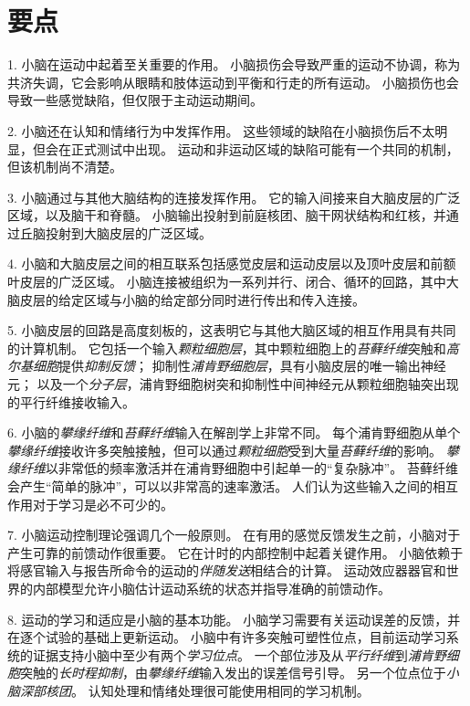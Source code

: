 \section{要点}

1. 小脑在运动中起着至关重要的作用。
小脑损伤会导致严重的运动不协调，称为共济失调，它会影响从眼睛和肢体运动到平衡和行走的所有运动。
小脑损伤也会导致一些感觉缺陷，但仅限于主动运动期间。


2. 小脑还在认知和情绪行为中发挥作用。
这些领域的缺陷在小脑损伤后不太明显，但会在正式测试中出现。
运动和非运动区域的缺陷可能有一个共同的机制，但该机制尚不清楚。


3. 小脑通过与其他大脑结构的连接发挥作用。
它的输入间接来自大脑皮层的广泛区域，以及脑干和脊髓。
小脑输出投射到前庭核团、脑干网状结构和红核，并通过丘脑投射到大脑皮层的广泛区域。


4. 小脑和大脑皮层之间的相互联系包括感觉皮层和运动皮层以及顶叶皮层和前额叶皮层的广泛区域。
小脑连接被组织为一系列并行、闭合、循环的回路，其中大脑皮层的给定区域与小脑的给定部分同时进行传出和传入连接。


5. 小脑皮层的回路是高度刻板的，这表明它与其他大脑区域的相互作用具有共同的计算机制。
它包括一个输入\textit{颗粒细胞层}，其中颗粒细胞上的\textit{苔藓纤维}突触和\textit{高尔基细胞}提供\textit{抑制反馈}；
抑制性\textit{浦肯野细胞层}，具有小脑皮层的唯一输出神经元；
以及一个\textit{分子层}，浦肯野细胞树突和抑制性中间神经元从颗粒细胞轴突出现的平行纤维接收输入。


6. 小脑的\textit{攀缘纤维}和\textit{苔藓纤维}输入在解剖学上非常不同。
每个浦肯野细胞从单个\textit{攀缘纤维}接收许多突触接触，但可以通过\textit{颗粒细胞}受到大量\textit{苔藓纤维}的影响。
\textit{攀缘纤维}以非常低的频率激活并在浦肯野细胞中引起单一的“复杂脉冲”。
苔藓纤维会产生“简单的脉冲”，可以以非常高的速率激活。
人们认为这些输入之间的相互作用对于学习是必不可少的。


7. 小脑运动控制理论强调几个一般原则。
在有用的感觉反馈发生之前，小脑对于产生可靠的前馈动作很重要。
它在计时的内部控制中起着关键作用。
小脑依赖于将感官输入与报告所命令的运动的\textit{伴随发送}相结合的计算。
运动效应器器官和世界的内部模型允许小脑估计运动系统的状态并指导准确的前馈动作。


8. 运动的学习和适应是小脑的基本功能。
小脑学习需要有关运动误差的反馈，并在逐个试验的基础上更新运动。
小脑中有许多突触可塑性位点，目前运动学习系统的证据支持小脑中至少有两个\textit{学习位点}。
一个部位涉及从\textit{平行纤维}到\textit{浦肯野细胞}突触的\textit{长时程抑制}，由\textit{攀缘纤维}输入发出的误差信号引导。
另一个位点位于\textit{小脑深部核团}。
认知处理和情绪处理很可能使用相同的学习机制。



